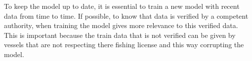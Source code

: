 To keep the model up to date, it is essential to train a new model with recent data from time to time. If possible, to know that data is verified by a competent authority, when training the model gives more relevance to this verified data. This is important because the train data that is not verified can be given by vessels that are not respecting there fishing license and this way corrupting the model.








